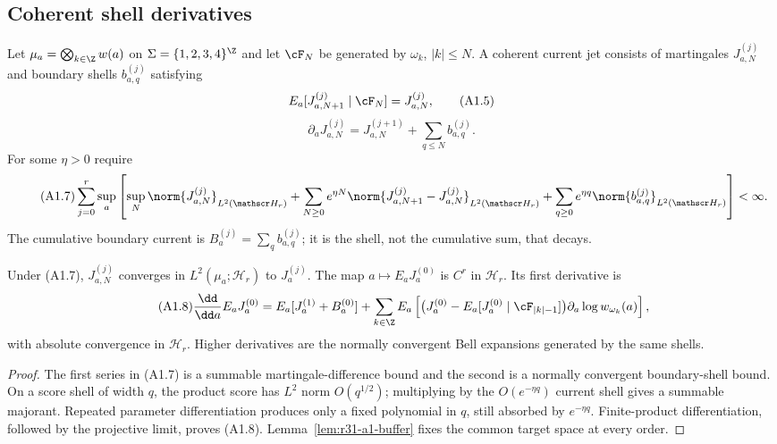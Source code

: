 \subsection{Coherent shell derivatives}

Let $\mu_a=\bigotimes_{k\in\Z}w(a)$ on
$\Sigma=\{1,2,3,4\}^{\Z}$ and let $\cF_N$ be generated by
$\omega_k$, $|k|\le N$.  A coherent current jet consists of martingales
$J^{(j)}_{a,N}$ and boundary shells $b^{(j)}_{a,q}$ satisfying
\[
 E_a[J^{(j)}_{a,N+1}\mid\cF_N]=J^{(j)}_{a,N},             \tag{A1.5}
\]
\[
 \partial_aJ^{(j)}_{a,N}=J^{(j+1)}_{a,N}
   +\sum_{q\le N}b^{(j)}_{a,q}.                            \tag{A1.6}
\]
For some $\eta>0$ require
\begin{equation}\tag{A1.7}
 \sum_{j=0}^r\sup_a\left[
  \sup_N\norm{J^{(j)}_{a,N}}_{L^2(\mathscr H_r)}
 +\sum_{N\ge0}e^{\eta N}
  \norm{J^{(j)}_{a,N+1}-J^{(j)}_{a,N}}_{L^2(\mathscr H_r)}
 +\sum_{q\ge0}e^{\eta q}
  \norm{b^{(j)}_{a,q}}_{L^2(\mathscr H_r)}
 \right]<\infty.
\end{equation}
The cumulative boundary current is
$B_a^{(j)}=\sum_qb^{(j)}_{a,q}$; it is the shell, not the cumulative sum,
that decays.

\begin{theorem}
\label{thm:r31-a1-response}
Under (A1.7), $J^{(j)}_{a,N}$ converges in
$L^2(\mu_a;\mathscr H_r)$ to $J_a^{(j)}$.  The map
$a\mapsto E_aJ_a^{(0)}$ is $C^r$ in $\mathscr H_r$.  Its first derivative is
\begin{equation}\tag{A1.8}
 {\dd\over\dd a}E_aJ_a^{(0)}
 =E_a[J_a^{(1)}+B_a^{(0)}]
 +\sum_{k\in\Z}E_a\left[
   \bigl(J_a^{(0)}-E_a[J_a^{(0)}\mid\cF_{|k|-1}]\bigr)
   \partial_a\log w_{\omega_k}(a)\right],
\end{equation}
with absolute convergence in $\mathscr H_r$.  Higher derivatives are the
normally convergent Bell expansions generated by the same shells.
\end{theorem}

\begin{proof}
The first series in (A1.7) is a summable martingale-difference bound and the
second is a normally convergent boundary-shell bound.  On a score shell of
width $q$, the product score has $L^2$ norm $O(q^{1/2})$; multiplying by the
$O(e^{-\eta q})$ current shell gives a summable majorant.  Repeated
parameter differentiation produces only a fixed polynomial in $q$, still
absorbed by $e^{-\eta q}$.  Finite-product differentiation, followed by the
projective limit, proves (A1.8).  Lemma~\ref{lem:r31-a1-buffer} fixes the
common target space at every order.
\end{proof}

